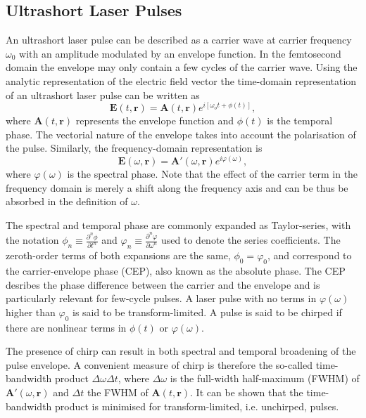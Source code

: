 \documentclass[a4paper]{jpconf}
\begin{document}
\subsection{Ultrashort Laser Pulses}
An ultrashort laser pulse can be described as a carrier wave at carrier frequency $\omega_0$ with an amplitude modulated by an envelope function. In the femtosecond domain the envelope may only contain a few cycles of the carrier wave. Using the analytic representation of the electric field vector the time-domain representation of an ultrashort laser pulse can be written as 
\begin{equation}
\mathbf{E}(t, \mathbf{r}) = \mathbf{A}(t, \mathbf{r}) e^{i[ \omega_o t + \phi(t)]},
\end{equation}
where $\mathbf{A}(t, \mathbf{r})$ represents the envelope function and $\phi(t)$ is the temporal phase. The vectorial nature of the envelope takes into account the polarisation of the pulse. Similarly, the frequency-domain representation is 
\begin{equation}
\mathbf{E}(\omega, \mathbf{r}) = \mathbf{A}'(\omega, \mathbf{r}) e^{i \varphi(\omega)},
\end{equation}
where $\varphi(\omega)$ is the spectral phase. Note that the effect of the carrier term in the frequency domain is merely a shift along the frequency axis and can be thus be absorbed in the definition of $\omega$. \par 
The spectral and temporal phase are commonly expanded as Taylor-series, with the notation $\phi_n \equiv \frac{\partial^n \phi}{\partial t^n}$ and $\varphi_n \equiv \frac{\partial^n \varphi}{\partial \omega^n}$ used to denote the series coefficients. The zeroth-order terms of both expansions are the same, $\phi_0 = \varphi_0$, and correspond to the carrier-envelope phase (CEP), also known as the absolute phase. The CEP desribes the phase difference between the carrier and the envelope and is particularly relevant for few-cycle pulses. A laser pulse with no terms in $\varphi(\omega)$ higher than $\varphi_0$ is said to be transform-limited. A pulse is said to be chirped if there are nonlinear terms in $\phi(t)$ or $\varphi(\omega)$. \par 
The presence of chirp can result in both spectral and temporal broadening of the pulse envelope. A convenient measure of chirp is therefore the so-called time-bandwidth product $\Delta \omega \Delta t$, where $\Delta \omega$ is the full-width half-maximum (FWHM) of $\mathbf{A}'(\omega, \mathbf{r})$ and $\Delta t$ the FWHM of $\mathbf{A}(t, \mathbf{r})$. It can be shown that the time-bandwidth product is minimised for transform-limited, i.e. unchirped, pulses. \par 
\end{document}
